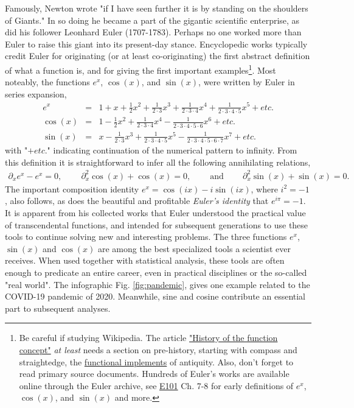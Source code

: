 \documentclass[nofootinbib,preprint]{revtex4-1}
\begin{document}
Famously, Newton wrote "if I have seen further it is by standing on the shoulders of Giants." 
In so doing he became a part of the gigantic scientific enterprise, as did his follower 
Leonhard Euler (1707-1783). Perhaps no one worked more than Euler to raise this 
giant into its present-day stance. Encyclopedic works typically credit Euler for originating 
(or at least co-originating) the first abstract definition of what a function 
is, and for giving the first important examples\footnote{Be careful if studying Wikipedia. 
The article \href{https://en.wikipedia.org/wiki/History_of_the_function_concept}{"History 
of the function concept"} \textit{at least} needs a section on pre-history, starting with 
compass and straightedge, the \underline{functional implements} of antiquity. Also,
don't forget to read primary source documents. Hundreds of Euler's works are available online
through the Euler archive\cite{EULER2019}, see \href{http://eulerarchive.maa.org/pages/E101.html}{E101}
Ch. 7-8 for early definitions of $e^x$, $\cos(x)$, and $\sin(x)$ and more. }.
Most noteably, the functions $e^x$, $\cos(x)$, and $\sin(x)$, were written by 
Euler in series expansion, 
\begin{eqnarray}
e^x &=& 1+x+\frac{1}{2}x^2+\frac{1}{2\cdot 3}x^3  +\frac{1}{2\cdot 3 \cdot 4}x^4  +\frac{1}{2\cdot 3\cdot 4\cdot 5}x^5  + etc.     \nonumber \\
\cos(x) &=& 1-\frac{1}{2}x^2 +\frac{1}{2\cdot 3\cdot 4}x^4 - \frac{1}{2\cdot 3\cdot 4\cdot 5\cdot 6}x^6 + etc.  \nonumber \\ 
\sin(x) &=& x-\frac{1}{2\cdot 3}x^3 +\frac{1}{2\cdot 3\cdot 4\cdot 5}x^5  - \frac{1}{2\cdot 3\cdot 4\cdot 5\cdot 6\cdot 7}x^7 + etc.     \nonumber 
\end{eqnarray}
with "$+ etc.$" indicating continuation of the numerical pattern to infinity. From this 
definition it is straightforward to infer all the following annihilating relations,
\begin{eqnarray}
\partial_x e^x - e^x = 0, \;\;\;\;\;\;\;\; \partial_x^2 \cos(x) + \cos(x) = 0, 
\;\;\;\;\;\;\;\; \text{and} \;\;\;\;\;\;\;\; \partial_x^2 \sin(x) + \sin(x) = 0. \nonumber
\end{eqnarray}
The important composition identity $e^x = \cos(i x) - i \sin(i x)$, where $i^2=-1$, 
also follows, as does the beautiful and profitable \textit{Euler's identity} that $e^{i\pi}=-1$.
It is apparent from his collected works that Euler understood the practical value of 
transcendental functions, and intended for subsequent generations to use these tools 
to continue solving new and interesting problems. The three functions $e^x$, $\sin(x)$ 
and $\cos(x)$ are among the best specialized tools a scientist ever receives. When 
used together with statistical analysis, these tools are often enough to predicate 
an entire career, even in practical disciplines or the so-called "real world". The 
infographic Fig. \ref{fig:pandemic}, gives one example related to the COVID-19 
pandemic of 2020. Meanwhile, sine and cosine contribute an essential part 
to subsequent analyses. 
\end{document}
